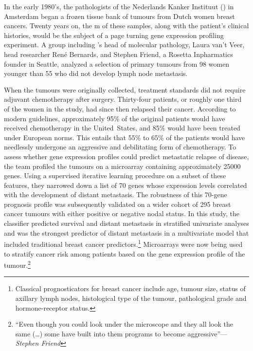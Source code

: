 
\medskip

In the early 1980's, the pathologists of the Nederlands Kanker Instituut
() in Amsterdam began a frozen tissue bank of tumours from Dutch
women breast cancers.  Twenty years on, the m of these samples,
along with the patient's clinical histories, would be the subject of a page
turning gene expression profiling experiment.  A group including
's head of molecular pathology, Laura van't Veer, head researcher
René Bernards, and Stephen Friend, a Rosetta Inpharmatics founder in Seattle,
analyzed a selection of primary tumours from 98 women younger than 55 who did
not develop lymph node metastasis.\cite{vant_veer_gene_2002}

When the tumours were originally collected, treatment standards did not require
adjuvant chemotherapy after surgery.  Thirty-four patients, or roughly one third
of the women in the study, had since then relapsed their cancer.  According to
modern guidelines, approximately 95\% of the original patients would have
received chemotherapy in the \mbox{United States}, and 85\% would have been
treated under European norms.  This entails that 55\% to 65\% of the patients
would have needlessly undergone an aggressive and debilitating form of
chemotherapy.  To assess whether gene expression profiles could predict
metastatic relapse of disease, the  team profiled the tumours on
a microarray containing approximately \num{25000} genes.  Using a supervised
iterative learning procedure on a subset of these features, they narrowed down a
list of 70 genes whose expression levels correlated with the development of
distant metastasis.  The robustness of this \mbox{70-gene} prognosis profile was
subsequently validated on a wider cohort of 295 breast cancer tumours with
either positive or negative nodal
status.\cite{van_de_vijver_gene-expression_2002} In this study, the classifier
predicted survival and distant metastasis in stratified univariate analyses and
was the strongest predictor of distant metastasis in a multivariate model that
included traditional breast cancer predictors.\footnote{Classical
  prognosticators for breast cancer include age, tumour size, status of axillary
  lymph nodes, histological type of the tumour, pathological grade and
  \mbox{hormone-receptor} status.}  Microarrays were now being used to stratify
cancer risk among patients based on the gene expression profile of the
tumour.\footnote{``Even though you could look under the microscope and they all
  look the same (\ldots{}) some have built into them programs to become
  aggressive''---\emph{Stephen Friend}}

